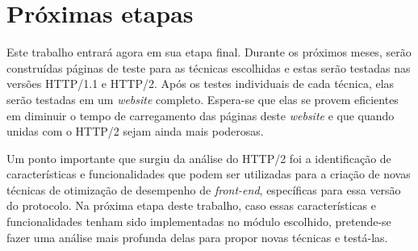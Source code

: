 \section{Próximas etapas}
\label{sec:proximas_etapas}

Este trabalho entrará agora em sua etapa final. Durante os próximos meses, serão construídas páginas de teste para as técnicas escolhidas e estas serão testadas nas versões HTTP/1.1 e HTTP/2. Após os testes individuais de cada técnica, elas serão testadas em um \textit{website} completo. Espera-se que elas se provem eficientes em diminuir o tempo de carregamento das páginas deste \textit{website} e que quando unidas com o HTTP/2 sejam ainda mais poderosas.

Um ponto importante que surgiu da análise do HTTP/2 foi a identificação de características e funcionalidades que podem ser utilizadas para a criação de novas técnicas de otimização de desempenho de \textit{front-end}, específicas para essa versão do protocolo. Na próxima etapa deste trabalho, caso essas características e funcionalidades tenham sido implementadas no módulo escolhido, pretende-se fazer uma análise mais profunda delas para propor novas técnicas e testá-las.

